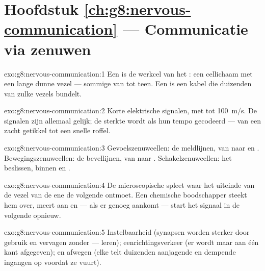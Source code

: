 \section*{Hoofdstuk \ref{ch:g8:nervous-communication} --- Communicatie via zenuwen}

\begin{solution}{exo:g8:nervous-communication:1}
Een  is de werkcel van het : een cellichaam met een
lange dunne vezel --- sommige van  tot teen. Een  is een
kabel die duizenden van zulke vezels bundelt.
\end{solution}

\begin{solution}{exo:g8:nervous-communication:2}
Korte elektrische signalen, met tot \qty{100}{m/s}. De signalen zijn
allemaal gelijk; de sterkte wordt als hun tempo gecodeerd --- van een
zacht getikkel tot een snelle roffel.
\end{solution}

\begin{solution}{exo:g8:nervous-communication:3}
Gevoelszenuwcellen: de meldlijnen, van  naar  en
. Bewegingszenuwcellen: de bevellijnen, van  naar .
Schakelzenuwcellen: het beslissen, binnen  en .
\end{solution}

\begin{solution}{exo:g8:nervous-communication:4}
De microscopische spleet waar het uiteinde van de vezel van de ene
 de volgende  ontmoet. Een chemische boodschapper steekt hem
over, meert aan en --- als er genoeg aankomt --- start het signaal in de
volgende  opnieuw.
\end{solution}

\begin{solution}{exo:g8:nervous-communication:5}
Instelbaarheid (synapsen worden sterker door gebruik en vervagen zonder
--- leren); eenrichtingsverkeer (er wordt maar aan één kant afgegeven); en
afwegen (elke  telt duizenden aanjagende en dempende ingangen op
voordat ze vuurt).
\end{solution}


